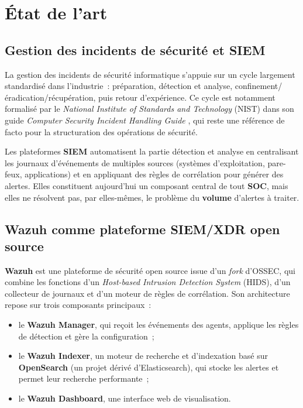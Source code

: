 \chapter{État de l'art}
\label{chap:etat_de_lart}

\section{Gestion des incidents de sécurité et SIEM}

La gestion des incidents de sécurité informatique s'appuie sur un cycle
largement standardisé dans l'industrie~: préparation, détection et analyse,
confinement/éradication/récupération, puis retour d'expérience. Ce cycle est
notamment formalisé par le \textit{National Institute of Standards and
Technology} (NIST) dans son guide \textit{Computer Security Incident
Handling Guide} \cite{nist80061}, qui reste une référence de facto pour la
structuration des opérations de sécurité.

Les plateformes \textbf{SIEM} automatisent la partie \og détection et
analyse\fg{} en centralisant les journaux d'événements de multiples sources
(systèmes d'exploitation, pare-feux, applications) et en appliquant des
règles de corrélation pour générer des alertes. Elles constituent aujourd'hui
un composant central de tout \textbf{SOC}, mais elles ne résolvent pas, par
elles-mêmes, le problème du \textbf{volume} d'alertes à traiter.

\section{Wazuh comme plateforme SIEM/XDR open source}

\textbf{Wazuh} \cite{wazuh_docs} est une plateforme de sécurité open source
issue d'un \textit{fork} d'OSSEC, qui combine les fonctions d'un
\textit{Host-based Intrusion Detection System} (HIDS), d'un collecteur de
journaux et d'un moteur de règles de corrélation. Son architecture repose
sur trois composants principaux~:

\begin{itemize}
  \item le \textbf{Wazuh Manager}, qui reçoit les événements des agents,
        applique les règles de détection et gère la configuration~;
  \item le \textbf{Wazuh Indexer}, un moteur de recherche et d'indexation
        basé sur \textbf{OpenSearch} \cite{opensearch_docs} (un projet dérivé
        d'Elasticsearch), qui stocke les alertes et permet leur recherche
        performante~;
  \item le \textbf{Wazuh Dashboard}, une interface web de visualisation.
\end{itemize}

